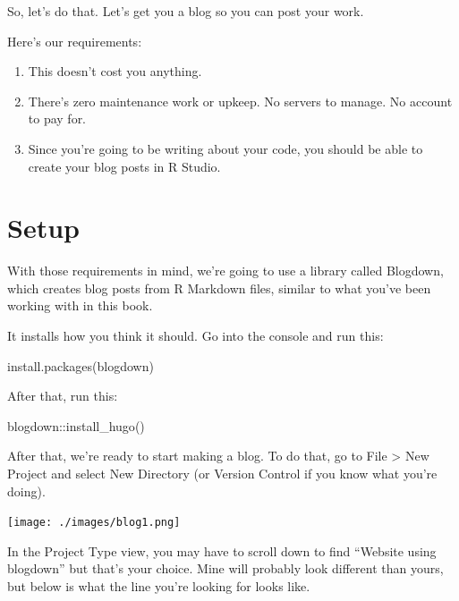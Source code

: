 \documentclass[
  letterpaper,
  DIV=11,
  numbers=noendperiod]{scrreprt}
\newenvironment{Shaded}{\begin{snugshade}}{\end{snugshade}}
\newcommand{\FunctionTok}[1]{\textcolor[rgb]{0.28,0.35,0.67}{#1}}
\newcommand{\NormalTok}[1]{\textcolor[rgb]{0.00,0.23,0.31}{#1}}
\newcommand{\SpecialCharTok}[1]{\textcolor[rgb]{0.37,0.37,0.37}{#1}}
\newcommand{\StringTok}[1]{\textcolor[rgb]{0.13,0.47,0.30}{#1}}
\providecommand{\tightlist}{%
  \setlength{\itemsep}{0pt}\setlength{\parskip}{0pt}}\usepackage{longtable,booktabs,array}
\begin{document}
So, let's do that. Let's get you a blog so you can post your work.

Here's our requirements:

\begin{enumerate}
\def\labelenumi{\arabic{enumi}.}
\tightlist
\item
  This doesn't cost you anything.
\item
  There's zero maintenance work or upkeep. No servers to manage. No
  account to pay for.
\item
  Since you're going to be writing about your code, you should be able
  to create your blog posts in R Studio.
\end{enumerate}

\hypertarget{setup}{%
\section{Setup}\label{setup}}

With those requirements in mind, we're going to use a library called
Blogdown, which creates blog posts from R Markdown files, similar to
what you've been working with in this book.

It installs how you think it should. Go into the console and run this:

\begin{Shaded}
\begin{Highlighting}[]
\FunctionTok{install.packages}\NormalTok{(}\StringTok{\textquotesingle{}blogdown\textquotesingle{}}\NormalTok{) }
\end{Highlighting}
\end{Shaded}

After that, run this:

\begin{Shaded}
\begin{Highlighting}[]
\NormalTok{blogdown}\SpecialCharTok{::}\FunctionTok{install\_hugo}\NormalTok{()}
\end{Highlighting}
\end{Shaded}

After that, we're ready to start making a blog. To do that, go to File
\textgreater{} New Project and select New Directory (or Version Control
if you know what you're doing).

\texttt{[image: ./images/blog1.png]}

In the Project Type view, you may have to scroll down to find ``Website
using blogdown'' but that's your choice. Mine will probably look
different than yours, but below is what the line you're looking for
looks like.
\end{document}
